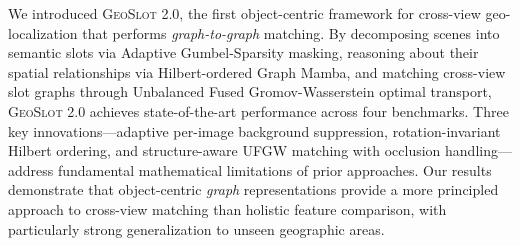 \documentclass{article}
\newcommand{\oursv}{\textsc{GeoSlot 2.0}}
\begin{document}
We introduced \oursv{}, the first object-centric framework for cross-view geo-localization that performs \textit{graph-to-graph} matching. By decomposing scenes into semantic slots via Adaptive Gumbel-Sparsity masking, reasoning about their spatial relationships via Hilbert-ordered Graph Mamba, and matching cross-view slot graphs through Unbalanced Fused Gromov-Wasserstein optimal transport, \oursv{} achieves state-of-the-art performance across four benchmarks. Three key innovations---adaptive per-image background suppression, rotation-invariant Hilbert ordering, and structure-aware UFGW matching with occlusion handling---address fundamental mathematical limitations of prior approaches. Our results demonstrate that object-centric \textit{graph} representations provide a more principled approach to cross-view matching than holistic feature comparison, with particularly strong generalization to unseen geographic areas.
\end{document}
